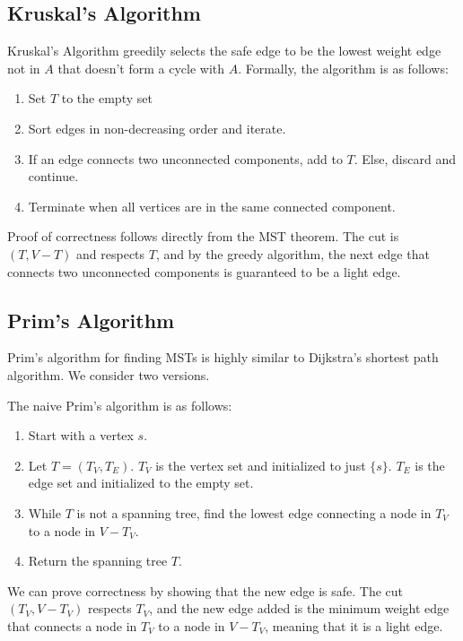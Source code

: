 \documentclass[10pt]{article}
\begin{document}
\subsection*{Kruskal's Algorithm}
Kruskal's Algorithm greedily selects the safe edge to be the lowest weight edge not in $A$ that doesn't form a cycle with $A$. Formally, the algorithm is as follows:
\begin{enumerate}
    \item Set $T$ to the empty set
    \item Sort edges in non-decreasing order and iterate.
    \item If an edge connects two unconnected components, add to $T$. Else, discard and continue.
    \item Terminate when all vertices are in the same connected component.
\end{enumerate}
Proof of correctness follows directly from the MST theorem. The cut is $(T, V-T)$ and respects $T$, and by the greedy algorithm, the next edge that connects two unconnected components is guaranteed to be a light edge.

\subsection*{Prim's Algorithm}
Prim's algorithm for finding MSTs is highly similar to Dijkstra's shortest path algorithm. We consider two versions.

The naive Prim's algorithm is as follows:
\begin{enumerate}
    \item Start with a vertex $s$.
    \item Let $T = (T_V, T_E)$. $T_V$ is the vertex set and initialized to just $\{s\}$. $T_E$ is the edge set and initialized to the empty set.
    \item While $T$ is not a spanning tree, find the lowest edge connecting a node in $T_V$ to a node in $V - T_V$.
    \item Return the spanning tree $T$.
\end{enumerate}

We can prove correctness by showing that the new edge is safe. The cut $(T_V, V - T_V)$ respects $T_V$, and the new edge added is the minimum weight edge that connects a node in $T_V$ to a node in $V - T_V$, meaning that it is a light edge.
\end{document}
